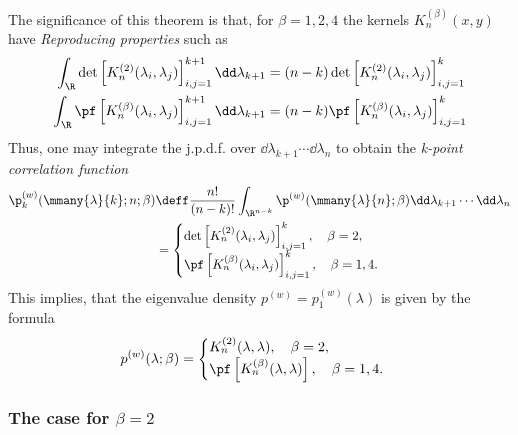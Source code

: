 The significance of this theorem is that, for $\beta = 1, 2, 4$ the kernels $K_n^{(\beta)}(x,y)$ have \textit{Reproducing properties} such as
\begin{align}
	\int_{\R} \det\left[ K_n^{(2)}(\lambda_i, \lambda_j) \right]_{i,j=1}^{k+1} \dd \lambda_{k+1} & = (n-k) \det\left[ K_n^{(2)}(\lambda_i, \lambda_j) \right]_{i,j=1}^{k} \\
	\int_{\R} \pf\left[ K_n^{(\beta)}(\lambda_i, \lambda_j) \right]_{i,j=1}^{k+1} \dd \lambda_{k+1} & = (n-k)  \pf\left[ K_n^{(\beta)}(\lambda_i, \lambda_j) \right]_{i,j=1}^{k}
	\label{Eq: Reproducibility}
\end{align}
Thus, one may integrate the j.p.d.f. over $\dd \lambda_{k+1} \cdots \dd \lambda_n$ to obtain the \textit{k-point correlation function}
\begin{align}
	\p_k^{(w)}(\mmany{\lambda}{k};n;\beta) & \deff \frac{n!}{(n-k)!} \int_{\R^{n-k}} \p^{(w)}(\mmany{\lambda}{n};\beta) \dd \lambda_{k+1} \cdots \dd \lambda_n \\
	& =
	\begin{cases}
		\det\left[ K_n^{(2)}(\lambda_i, \lambda_j) \right]_{i,j=1}^{k}, \quad \beta = 2, \\
		\pf\left[ K_n^{(\beta)}(\lambda_i, \lambda_j) \right]_{i,j=1}^{k}, \quad \beta = 1,4.
	\end{cases}
\end{align}
This implies, that the eigenvalue density $p^{(w)} = p_1^{(w)}(\lambda)$ is given by the formula
\begin{equation}
	p^{(w)}(\lambda; \beta) = 
	\begin{cases}
		K_n^{(2)}(\lambda, \lambda), \quad \beta = 2, \\
		\pf\left[ K_n^{(\beta)}(\lambda, \lambda) \right], \quad \beta = 1,4.
	\end{cases}
\end{equation}

\subsubsection{The case for $\beta = 2$}
\label{Subsection: The case for beta 2}

